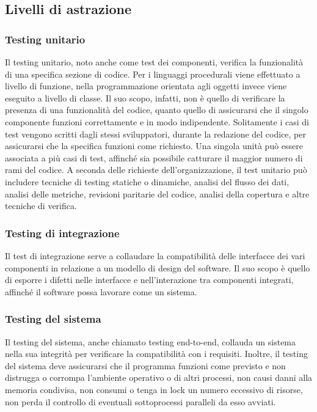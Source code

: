 \documentclass[../main.tex]{subfiles}
\begin{document}
\subsection{Livelli di astrazione}
\subsubsection{Testing unitario}
Il testing unitario, noto anche come test dei componenti, verifica la funzionalità di una specifica sezione di codice.
Per i linguaggi procedurali viene effettuato a livello di funzione, nella programmazione orientata agli oggetti invece viene eseguito a livello di classe. Il suo scopo, infatti, non è quello di verificare la presenza di una funzionalità del codice, quanto quello di assicurarsi che il singolo componente funzioni correttamente e in modo indipendente.
Solitamente i casi di test vengono scritti dagli stessi sviluppatori, durante la redazione del codice, per assicurarsi che la specifica funzioni come richiesto.
Una singola unità può essere associata a più casi di test, affinché sia possibile catturare il maggior numero di rami del codice.
A seconda delle richieste dell'organizzazione, il test unitario può includere tecniche di testing statiche o dinamiche, analisi del flusso dei dati, analisi delle metriche, revisioni paritarie del codice, analisi della copertura e altre tecniche di verifica.
\subsubsection{Testing di integrazione}
Il test di integrazione serve a collaudare la compatibilità delle interfacce dei vari componenti in relazione a un modello di design del software.
Il suo scopo è quello di esporre i difetti nelle interfacce e nell'interazione tra componenti integrati, affinché il software possa lavorare come un sistema.

\subsubsection{Testing del sistema}
Il testing del sistema, anche chiamato testing end-to-end, collauda un sistema nella sua integrità per verificare la compatibilità con i requisiti.
Inoltre, il testing del sistema deve assicurarsi che il programma funzioni come previsto e non distrugga o corrompa l'ambiente operativo o di altri processi, non causi danni alla memoria condivisa, non consumi o tenga in lock un numero eccessivo di risorse, non perda il controllo di eventuali sottoprocessi paralleli da esso avviati.
\end{document}
